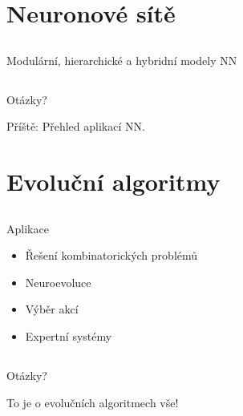 \documentclass{beamer}
\begin{document}
\section{Neuronové sítě}

\subsection{}
\begin{frame}{Modulární, hierarchické a hybridní modely NN}
\end{frame}

\subsection{}
\begin{frame}{Otázky?}
\begin{center}
Příště: Přehled aplikací NN.
\end{center}
\end{frame}

\section{Evoluční algoritmy}

\subsection{}
\begin{frame}{Aplikace}
\begin{itemize}
\item Řešení kombinatorických problémů
\item Neuroevoluce
\item Výběr akcí
\item Expertní systémy
\end{itemize}
\end{frame}

\subsection{}
\begin{frame}{Otázky?}
\begin{center}
To je o evolučních algoritmech vše!
\end{center}
\end{frame}
\end{document}
